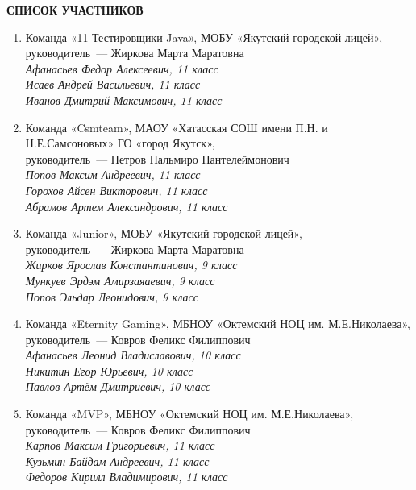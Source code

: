 \noindent\textbf{СПИСОК УЧАСТНИКОВ}
\begin{enumerate}
\item Команда «11 Тестировщики Java», МОБУ «Якутский городской лицей», \\
руководитель~— Жиркова Марта Маратовна \\
\it
\indent Афанасьев Федор Алексеевич, 11 класс \\
\indent Исаев Андрей Васильевич, 11 класс \\
\indent Иванов Дмитрий Максимович, 11 класс
\rm

\item Команда «Csmteam», МАОУ «Хатасская СОШ имени П.Н. и Н.Е.Самсоновых» ГО «город Якутск», \\
руководитель~— Петров Пальмиро Пантелеймонович \\
\it
\indent Попов Максим Андреевич, 11 класс \\
\indent Горохов Айсен Викторович, 11 класс \\
\indent Абрамов Артем Александрович, 11 класс
\rm

\item Команда «Junior», МОБУ «Якутский городской лицей», \\
руководитель~— Жиркова Марта Маратовна \\
\it
\indent Жирков Ярослав Константинович, 9 класс \\
\indent Мункуев Эрдэм Амирзаяаевич, 9 класс \\
\indent Попов Эльдар Леонидович, 9 класс
\rm

\item Команда «Eternity Gaming», МБНОУ «Октемский НОЦ им. М.Е.Николаева», \\
руководитель~— Ковров Феликс Филиппович \\
\it
\indent Афанасьев Леонид Владиславович, 10 класс \\
\indent Никитин Егор Юрьевич, 10 класс \\
\indent Павлов Артём Дмитриевич, 10 класс
\rm

\item Команда «MVP», МБНОУ «Октемский НОЦ им. М.Е.Николаева», \\
руководитель~— Ковров Феликс Филиппович \\
\it
\indent Карпов Максим Григорьевич, 11 класс \\
\indent Кузьмин Байдам Андреевич, 11 класс \\
\indent Федоров Кирилл Владимирович, 11 класс
\rm


\end{enumerate}
